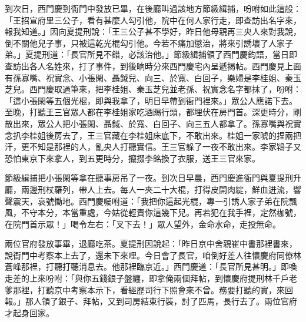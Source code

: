到次日，西門慶到衙門中發放已畢，在後廳叫過該地方節級緝捕，吩咐如此這般：「王招宣府里三公子，看有甚麼人勾引他，院中在何人家行走，即查訪出名字來，報我知道。」因向夏提刑說：「王三公子甚不學好，昨日他母親再三央人來對我說，倒不關他兒子事，只被這乾光棍勾引他。今若不痛加懲治，將來引誘壞了人家子弟。」夏提刑道：「長官所見不錯，必該治他。」節級緝捕領了西門慶鈞語，當日即查訪出各人名姓來，打了事件，到後晌時分來西門慶宅內呈遞揭帖。西門慶見上面有孫寡嘴、祝實念、小張閑、聶鉞兒、向三、於寬、白回子，樂婦是李桂姐、秦玉芝兒。西門慶取過筆來，把李桂姐、秦玉芝兒並老孫、祝實念名字都抹了，吩咐：「這小張閑等五個光棍，即與我拿了，明日早帶到衙門裡來。」眾公人應諾下去。至晚，打聽王三官眾人都在李桂姐家吃酒踢行頭，都埋伏在房門首。深更時分，剛散出來，眾公人把小張閑、聶鉞、於寬、白回子、向三五人都拿了。孫寡嘴與祝實念扒李桂姐後房去了，王三官藏在李桂姐床底下，不敢出來。桂姐一家唬的捏兩把汗，更不知是那裡的人，亂央人打聽實信。王三官躲了一夜不敢出來。李家鴇子又恐怕東京下來拿人，到五更時分，攛掇李銘換了衣服，送王三官來家。

節級緝捕把小張閑等拿在聽事房吊了一夜。到次日早晨，西門慶進衙門與夏提刑升廳，兩邊刑杖羅列，帶人上去。每人一夾二十大棍，打得皮開肉綻，鮮血迸流，響聲震天，哀號慟地。西門慶囑咐道：「我把你這起光棍，專一引誘人家子弟在院飄風，不守本分，本當重處，今姑從輕責你這幾下兒。再若犯在我手裡，定然枷號，在院門首示眾！」喝令左右：「叉下去！」眾人望外，金命水命，走投無命。

兩位官府發放事畢，退廳吃茶。夏提刑因說起：「昨日京中舍親崔中書那裡書來，說衙門中考察本上去了，還未下來哩。今日會了長官，咱倒好差人往懷慶府同僚林蒼峰那裡，打聽打聽消息去。他那裡臨京近。」西門慶道：「長官所見甚明。」即喚走差的上來吩咐：「與你五錢銀子盤纏，即拿俺兩個拜帖，到懷慶府提刑林千戶老爹那裡，打聽京中考察本示下，看經歷司行下照會來不曾。務要打聽的實，來回報。」那人領了銀子、拜帖，又到司房結束行裝，討了匹馬，長行去了。兩位官府才起身回家。

